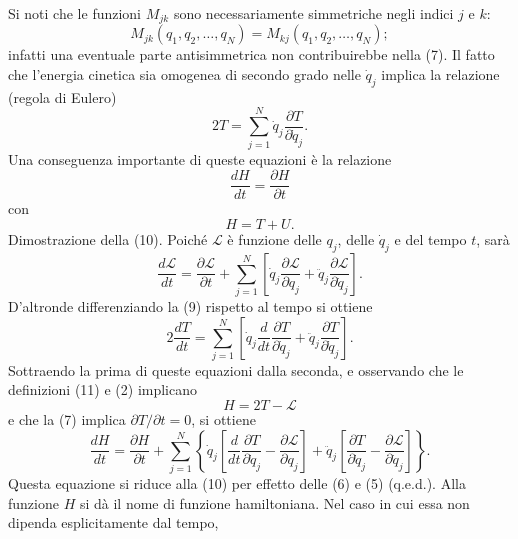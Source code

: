 \documentclass[11pt, a4paper]{book}
\numberwithin{equation}{section}
\begin{document}
Si noti che le funzioni $M_{jk}$ sono necessariamente simmetriche negli indici $j$ e $k$:
\begin{equation}
M_{jk}(q_1, q_2, \dots, q_N) = M_{kj}(q_1, q_2, \dots, q_N);
\end{equation}
infatti una eventuale parte antisimmetrica non contribuirebbe nella (7). Il fatto che l'energia cinetica sia omogenea di secondo grado nelle $\dot{q}_j$ implica la relazione (regola di Eulero)
\begin{equation}
2T = \sum_{j=1}^{N} \dot{q}_j \frac{\partial T}{\partial \dot{q}_j}.
\end{equation}
Una conseguenza importante di queste equazioni è la relazione
\begin{equation}
\frac{dH}{dt} = \frac{\partial H}{\partial t}
\end{equation}
con
\begin{equation}
H = T + U.
\end{equation}
Dimostrazione della (10). Poiché $\mathcal{L}$ è funzione delle $q_j$, delle $\dot{q}_j$ e del tempo $t$, sarà
\begin{equation*}
\frac{d\mathcal{L}}{dt} = \frac{\partial \mathcal{L}}{\partial t} + \sum_{j=1}^{N} \left[ \dot{q}_j \frac{\partial \mathcal{L}}{\partial q_j} + \ddot{q}_j \frac{\partial \mathcal{L}}{\partial \dot{q}_j} \right].
\end{equation*}
D'altronde differenziando la (9) rispetto al tempo si ottiene
\begin{equation*}
2 \frac{dT}{dt} = \sum_{j=1}^{N} \left[ \dot{q}_j \frac{d}{dt} \frac{\partial T}{\partial \dot{q}_j} + \ddot{q}_j \frac{\partial T}{\partial \dot{q}_j} \right].
\end{equation*}
Sottraendo la prima di queste equazioni dalla seconda, e osservando che le definizioni (11) e (2) implicano
\begin{equation*}
H = 2T - \mathcal{L}
\end{equation*}
e che la (7) implica $\partial T / \partial t = 0$, si ottiene
\begin{equation*}
\frac{dH}{dt} = \frac{\partial H}{\partial t} + \sum_{j=1}^{N} \left\{ \dot{q}_j \left[ \frac{d}{dt} \frac{\partial T}{\partial \dot{q}_j} - \frac{\partial \mathcal{L}}{\partial q_j} \right] + \ddot{q}_j \left[ \frac{\partial T}{\partial \dot{q}_j} - \frac{\partial \mathcal{L}}{\partial \dot{q}_j} \right] \right\}.
\end{equation*}
Questa equazione si riduce alla (10) per effetto delle (6) e (5) (q.e.d.). Alla funzione $H$ si dà il nome di funzione hamiltoniana. Nel caso in cui essa non dipenda esplicitamente dal tempo,
\end{document}
